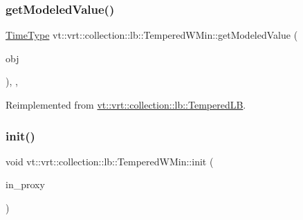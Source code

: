 \subsubsection{\texorpdfstring{get\+Modeled\+Value()}{getModeledValue()}}
{\footnotesize\ttfamily \hyperlink{namespacevt_a876a9d0cd5a952859c72de8a46881442}{Time\+Type} vt\+::vrt\+::collection\+::lb\+::\+Tempered\+W\+Min\+::get\+Modeled\+Value (\begin{DoxyParamCaption}\item[{const \hyperlink{structvt_1_1elm_1_1_element_i_d_struct}{elm\+::\+Element\+I\+D\+Struct} \&}]{obj }\end{DoxyParamCaption})\hspace{0.3cm}{\ttfamily [override]}, {\ttfamily [protected]}, {\ttfamily [virtual]}}



Reimplemented from \hyperlink{structvt_1_1vrt_1_1collection_1_1lb_1_1_tempered_l_b_af0068125a6548e98f45142a736a0742c}{vt\+::vrt\+::collection\+::lb\+::\+Tempered\+LB}.

\mbox{\label{structvt_1_1vrt_1_1collection_1_1lb_1_1_tempered_w_min_a4568be2f1baa683968308e48a0743dea}} 
\subsubsection{\texorpdfstring{init()}{init()}}
{\footnotesize\ttfamily void vt\+::vrt\+::collection\+::lb\+::\+Tempered\+W\+Min\+::init (\begin{DoxyParamCaption}\item[{\hyperlink{structvt_1_1objgroup_1_1proxy_1_1_proxy}{objgroup\+::proxy\+::\+Proxy}$<$ \hyperlink{structvt_1_1vrt_1_1collection_1_1lb_1_1_tempered_w_min}{Tempered\+W\+Min} $>$}]{in\+\_\+proxy }\end{DoxyParamCaption})}

\mbox{\label{structvt_1_1vrt_1_1collection_1_1lb_1_1_tempered_w_min_a0dd469ab6f3f8aebebf55c773df099ce}} 
